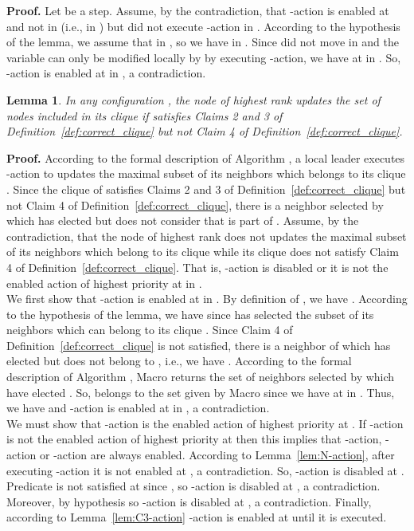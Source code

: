 \documentclass[11pt,letterpaper,onecolumn]{article}
\newtheorem{lemma}{Lemma}
\newenvironment{proof}{\noindent \begin{rm}{\textbf{Proof.} }}{\hspace*{\fill}\par\end{rm} \vspace{.3cm}}
\begin{document}
\begin{proof}
Let  be a step. Assume, by the contradiction, that -action is enabled at  and not in  (i.e.,  in ) but  did not execute -action in . According to the hypothesis of the lemma, we assume that  in , so we have  in . Since  did not move in  and the variable  can only be modified locally by  by executing -action, we have  at  in . So, -action is enabled at  in , a contradiction.
\end{proof}

\begin{lemma}
\label{lem:update_clique}
In any configuration , the node  of highest rank updates the set of nodes included in its clique  if  satisfies Claims 2 and 3 of Definition~\ref{def:correct_clique} but not Claim 4 of Definition~\ref{def:correct_clique}.
\end{lemma}

\begin{proof}
According to the formal description of Algorithm , a local leader executes -action to updates the maximal subset of its neighbors which belongs to its clique . Since the clique  of  satisfies Claims 2 and 3 of Definition~\ref{def:correct_clique} but not Claim 4 of Definition~\ref{def:correct_clique}, there is a neighbor  selected by  which has elected  but  does not consider that  is part of . Assume, by the contradiction, that the node  of highest rank does not updates the maximal subset of its neighbors which belong to its clique  while its clique  does not satisfy Claim 4 of Definition~\ref{def:correct_clique}. That is, -action is disabled or it is not the enabled action of highest priority at  in .\\
We first show that -action is enabled at  in . By definition of , we have . According to the hypothesis of the lemma, we have  since  has selected the subset of its neighbors which can belong to its clique . Since Claim 4 of Definition~\ref{def:correct_clique} is not satisfied, there is a neighbor  of  which has elected  but  does not belong to , i.e., we have . According to the formal description of Algorithm , Macro  returns the set of neighbors selected by  which have elected . So,  belongs to the set given by Macro  since we have  at  in . Thus, we have  and -action is enabled at  in , a contradiction.\\
We must show that -action is the enabled action of highest priority at . If -action is not the enabled action of highest priority at  then this implies that -action, -action or -action are always enabled. According to Lemma~\ref{lem:N-action}, after executing -action it is not enabled at , a contradiction. So, -action is disabled at . Predicate  is not satisfied at  since , so -action is disabled at , a contradiction. Moreover,  by hypothesis so -action is disabled at , a contradiction. Finally, according to Lemma~\ref{lem:C3-action} -action is enabled at  until it is executed.
\end{proof}
\end{document}
